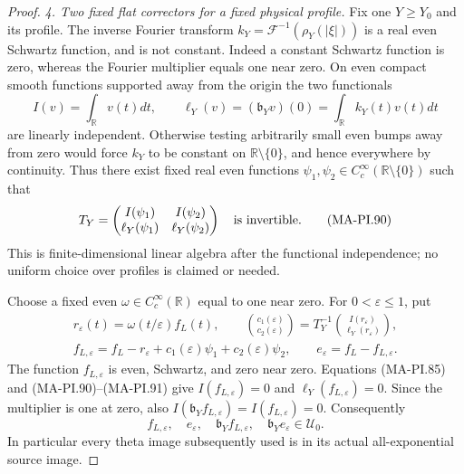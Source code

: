 \begin{proof}
\emph{4. Two fixed flat correctors for a fixed physical profile.}
Fix one $Y\ge Y_0$ and its profile. The inverse Fourier
transform $k_Y=\mathcal F^{-1}(\rho_Y(|\xi|))$ is a real
even Schwartz function, and is not constant. Indeed a
constant Schwartz function is zero, whereas the Fourier
multiplier equals one near zero. On even compact smooth
functions supported away from the origin the two
functionals
\[
 I(v)=\int_{\mathbb R}v(t)dt,\qquad
 \ell_Y(v)=(\mathfrak b_Yv)(0)
                         =\int_{\mathbb R}k_Y(t)v(t)dt
 \tag{MA-PI.89}
\]
are linearly independent. Otherwise testing arbitrarily
small even bumps away from zero would force $k_Y$ to be
constant on $\mathbb R\setminus\{0\}$, and hence everywhere
by continuity. Thus there exist fixed real even functions
$\psi_1,\psi_2\in C_c^\infty(\mathbb R\setminus\{0\})$
such that
\[
 T_Y=\begin{pmatrix}
 I(\psi_1)&I(\psi_2)\\
 \ell_Y(\psi_1)&\ell_Y(\psi_2)
 \end{pmatrix}
                         \quad\hbox{is invertible}.
 \tag{MA-PI.90}
\]
This is finite-dimensional linear algebra after the
functional independence; no uniform choice over profiles
is claimed or needed.

Choose a fixed even $\omega\in C_c^\infty(\mathbb R)$
equal to one near zero. For $0<\varepsilon\le1$, put
\[
 \begin{gathered}
 r_\varepsilon(t)=\omega(t/\varepsilon)f_L(t),\qquad
 \binom{c_1(\varepsilon)}{c_2(\varepsilon)}
       =T_Y^{-1}\binom{I(r_\varepsilon)}{\ell_Y(r_\varepsilon)},\\
 f_{L,\varepsilon}=f_L-r_\varepsilon
                    +c_1(\varepsilon)\psi_1
                    +c_2(\varepsilon)\psi_2,\qquad
 e_\varepsilon=f_L-f_{L,\varepsilon}.
 \end{gathered}
 \tag{MA-PI.91}
\]
The function $f_{L,\varepsilon}$ is even, Schwartz, and
zero near zero. Equations (MA-PI.85) and (MA-PI.90)--(MA-PI.91)
give $I(f_{L,\varepsilon})=0$ and
$\ell_Y(f_{L,\varepsilon})=0$. Since the multiplier
is one at zero, also
$I(\mathfrak b_Y f_{L,\varepsilon})=I(f_{L,\varepsilon})=0$.
Consequently
\[
 f_{L,\varepsilon},\quad e_\varepsilon,\quad
                 \mathfrak b_Y f_{L,\varepsilon},\quad
                 \mathfrak b_Y e_\varepsilon
                            \in\mathcal U_0.
 \tag{MA-PI.92}
\]
In particular every theta image subsequently used is
in its actual all-exponential source image.


\end{proof}
